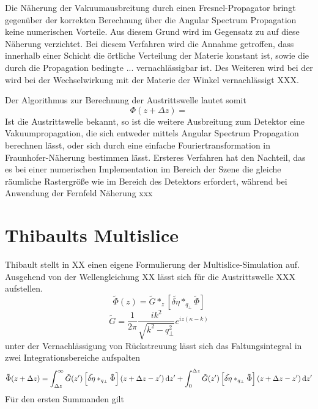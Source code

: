 	Die Näherung der Vakuumausbreitung durch einen Fresnel-Propagator bringt gegenüber der korrekten Berechnung über die Angular Spectrum Propagation keine numerischen Vorteile. Aus diesem Grund wird im Gegensatz zu \cite{hare1994} auf diese Näherung verzichtet. 
	Bei diesem Verfahren wird die Annahme getroffen, dass  innerhalb einer Schicht die örtliche Verteilung der Materie konstant ist, sowie die durch die Propagation bedingte ... vernachlässigbar ist\cite{hare1994}. Des Weiteren wird bei der wird bei der Wechselwirkung mit der Materie der Winkel vernachlässigt XXX.
	
	Der Algorithmus zur Berechnung der Austrittswelle lautet somit
	\begin{equation}
\Phi(z+\Delta z)=
	\end{equation}
	Ist die Austrittswelle bekannt, so ist die weitere Ausbreitung zum Detektor eine Vakuumpropagation, die sich entweder mittels Angular Spectrum Propagation berechnen lässt, oder sich durch eine einfache Fouriertransformation in Fraunhofer-Näherung bestimmen lässt. Ersteres Verfahren hat den Nachteil, das es bei einer numerischen Implementation im Bereich der Szene die gleiche räumliche Rastergröße wie im Bereich des Detektors erfordert, während bei Anwendung der Fernfeld Näherung xxx
\section{Thibaults Multislice}
Thibault stellt in XX einen eigene Formulierung der Multislice-Simulation auf. Ausgehend von der Wellengleichung XX
lässt sich für die Austrittswelle XXX aufstellen.
\begin{equation}
\tilde{\Phi}(z)=\tilde{G}\ast_z\left[\tilde{\delta\eta}\ast_{q_\perp} \tilde{\Phi}\right]
\end{equation}
\begin{equation}
\tilde{G}=\frac{1}{2\pi}\frac{ik^2}{\sqrt{k^2-q_\perp^2}}e^{iz(\kappa-k)}
\end{equation}
unter der Vernachlässigung von Rückstreuung lässt sich das Faltungsintegral in zwei Integrationsbereiche aufspalten
\begin{equation}
\tilde{\Phi}(z+\Delta z)=
\int_{\Delta z}^{\infty} \tilde{G}(z')\left[\tilde{\delta\eta}\ast_{q_\perp} \tilde{\Phi}\right](z+\Delta z-z')\dif z'
+
\int_{0}^{\Delta z} \tilde{G}(z')\left[\tilde{\delta\eta}\ast_{q_\perp} \tilde{\Phi}\right](z+\Delta z-z')\dif z'
\end{equation}
Für den ersten Summanden gilt

